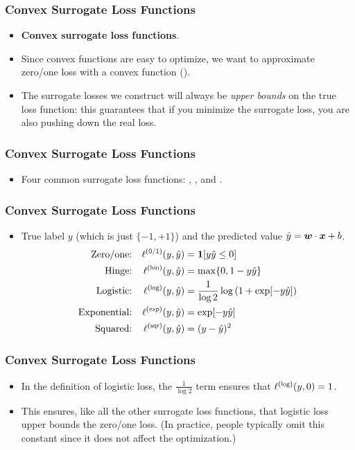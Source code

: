 \documentclass[trans]{beamer}
\begin{document}
\begin{frame}
  \frametitle{Convex Surrogate Loss Functions}
\begin{itemize}
\item  {\bf Convex surrogate loss functions}.
\item Since convex functions are easy to optimize,
we want to approximate zero/one loss with a convex function ().
\item  The
surrogate losses we construct will always be \emph{upper bounds} on
the true loss function: this guarantees that if you minimize the
surrogate loss, you are also pushing down the real loss.
\end{itemize}
\end{frame}

\begin{frame}
  \frametitle{Convex Surrogate Loss Functions}
\begin{itemize}
\item
Four common surrogate loss functions: , ,
 and . 
\end{itemize}
\end{frame}

\begin{frame}
  \frametitle{Convex Surrogate Loss Functions}
\begin{itemize}
\item True label $y$ (which is just $\{-1,+1\}$) and
the predicted value $\hat y = {\boldsymbol{w}} \cdot {\boldsymbol{x}}+b$.
%
\begin{align}
\text{Zero/one:}    && \ell\xth{0/1}(y,\hat y) &= \Ind[y \hat y \leq 0] \\
\text{Hinge:}       && \ell\xth{hin}(y,\hat y) &= \max \{ 0, 1-y\hat y \}\\
\text{Logistic:}    && \ell\xth{log}(y,\hat y) &= \frac 1 {\log2} \log\left( 1 + \exp[-y\hat y]\right)\\
\text{Exponential:} && \ell\xth{exp}(y,\hat y) &= \exp[-y\hat y]\\
\text{Squared:}     && \ell\xth{sqr}(y,\hat y) &= (y-\hat y)^2
\end{align}
%
\end{itemize}
\end{frame}

\begin{frame}
  \frametitle{Convex Surrogate Loss Functions}
\begin{itemize}
\item
In the definition of logistic loss, the $\frac 1 {\log2}$ term ensures that $\ell\xth{log}(y,0) = 1$. 
\item  This
ensures, like all the other surrogate loss functions, that logistic
loss upper bounds the zero/one loss.  (In practice, people typically
omit this constant since it does not affect the optimization.)
\end{itemize}
\end{frame}
\end{document}
